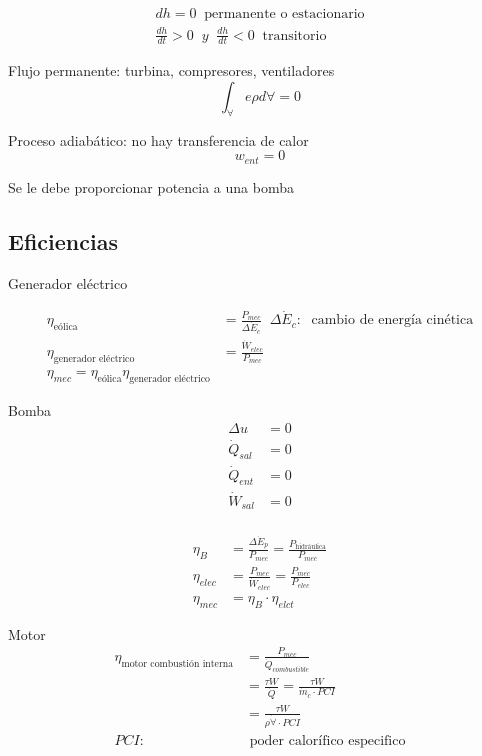 \[
    \begin{split}
        dh = 0 \;\; \text{permanente o estacionario} \\
        \frac{ dh }{ dt } > 0 \;\; y \;\; \frac{ dh }{ dt } < 0 \;\; \text{transitorio}
    \end{split}
\]

Flujo permanente: turbina, compresores, ventiladores
\[
    \int_{ \forall } e \rho d\forall = 0
\]

Proceso adiabático: no hay transferencia de calor
\[
    w_{ent} = 0
\]

Se le debe proporcionar potencia a una bomba

\subsection{Eficiencias}

Generador eléctrico

\[
    \begin{split}
        \eta_{ \text{eólica} } & = \frac{ P_{mec} }{ \Delta\dot{E}_{c} } \;\; \Delta \dot{E}_{c}: \; \text{ cambio de energía cinética} \\
        \eta_{ \text{generador eléctrico} } & = \frac{ \dot{W}_{elec} }{ P_{mec} } \\
        \eta_{mec} = \eta_{ \text{eólica} } \eta_{ \text{generador eléctrico} }
    \end{split}
\]

Bomba
\[
    \begin{split}
        \Delta u & = 0 \\
        \dot{Q}_{sal} & = 0 \\
        \dot{Q}_{ent} & = 0 \\
        \dot{W}_{sal} & = 0 \\
    \end{split}
\]

\[
    \begin{split}
        \eta_{B} & = \frac{ \Delta \dot{E}_{p} }{ P_{mec} } = \frac{ P_{ \text{hidráulica} } }{ P_{mec} } \\
        \eta_{elec} & = \frac{ P_{mec} }{ \dot{W}_{elec} } = \frac{ P_{mec} }{ P_{elec} } \\
        \eta_{mec} & = \eta_{B} \cdot \eta_{elct}
    \end{split}
\]

Motor
\[
    \begin{split}
        \eta_{ \text{motor combustión interna} } & = \frac{ P_{mec} }{ \dot{Q}_{combustible} } \\
        & = \frac{ \tau W }{ \dot{Q} } = \frac{ \tau W }{ \dot{m}_{c} \cdot PCI } \\
        & = \frac{ \tau W }{ \rho \dot{ \forall } \cdot PCI } \\
        PCI: & \text{ poder calorífico especifico}  
    \end{split}
\]

